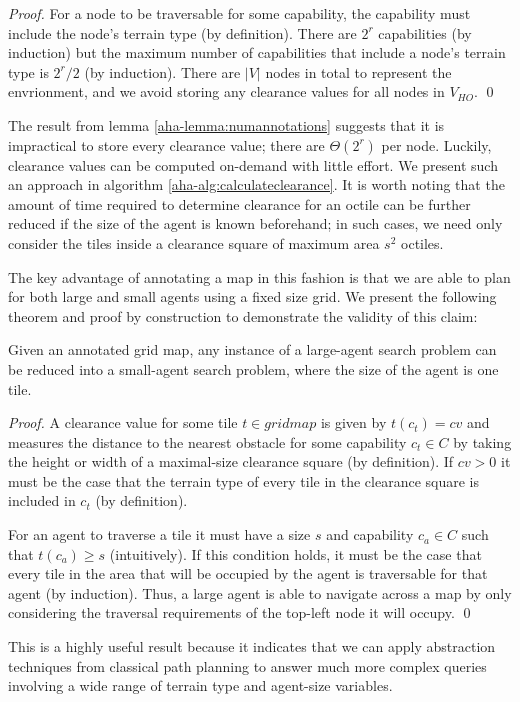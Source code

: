 \begin{proof}
For a node to be traversable for some capability, the capability must include the node's terrain type (by definition). 
There are $2^r$ capabilities (by induction) but the maximum number of capabilities that include a node's terrain type is $2^r/2$ (by induction). 
There are $|V|$ nodes in total to represent the envrionment, and we avoid storing any clearance values for all nodes in $V_{HO}$. 
\qed
\end{proof}

The result from lemma \ref{aha-lemma:numannotations} suggests that it is impractical to store every clearance value; there are $\Theta(2^r)$ per node.
Luckily, clearance values can be computed on-demand with little effort. 
We present such an approach in algorithm \ref{aha-alg:calculateclearance}. 
It is worth noting that the amount of time required to determine clearance for an octile can be further reduced if the size of the agent is known beforehand; in such cases, we need only consider the tiles inside a clearance square of maximum area $s^2$ octiles.

\par \indent
The key advantage of annotating a map in this fashion is that we are able to plan for both large and small agents using a fixed size grid. We present the following theorem and proof by construction to demonstrate the validity of this claim:
\begin{theorem}
\label{aha-theorem:reducibility}
Given an annotated grid map, any instance of a large-agent search problem can be reduced into a small-agent search problem, where the size of the agent is one tile.
\end{theorem}

\begin{proof}
A clearance value for some tile $t \in gridmap$ is given by $t(c_{t}) = cv$ and measures the distance to the nearest obstacle for some capability $c_{t} \in C$ by taking the height or width of a maximal-size clearance square (by definition). 
If $cv > 0$ it must be the case that the terrain type of every tile in the clearance square is included in $c_{t}$ (by definition). 
\par \indent
For an agent to traverse a tile it must have a size $s$ and capability $c_{a} \in C$ such that $t(c_{a}) \geq s$ (intuitively).
If this condition holds, it must be the case that every tile in the area that will be occupied by the agent is traversable for that agent (by induction). 
Thus, a large agent is able to navigate across a map by only considering the traversal requirements of the top-left node it will occupy. \qed
\end{proof}
This is a highly useful result because it indicates that we can apply abstraction techniques from classical path planning to answer much more complex queries involving a wide range of terrain type and agent-size variables.
